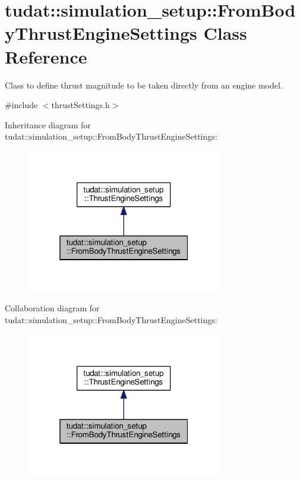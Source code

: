 \hypertarget{classtudat_1_1simulation__setup_1_1FromBodyThrustEngineSettings}{}\section{tudat\+:\+:simulation\+\_\+setup\+:\+:From\+Body\+Thrust\+Engine\+Settings Class Reference}
\label{classtudat_1_1simulation__setup_1_1FromBodyThrustEngineSettings}


Class to define thrust magnitude to be taken directly from an engine model.  




{\ttfamily \#include $<$thrust\+Settings.\+h$>$}



Inheritance diagram for tudat\+:\+:simulation\+\_\+setup\+:\+:From\+Body\+Thrust\+Engine\+Settings\+:
\nopagebreak
\begin{figure}[H]
\begin{center}
\leavevmode
\includegraphics[width=241pt]{classtudat_1_1simulation__setup_1_1FromBodyThrustEngineSettings__inherit__graph}
\end{center}
\end{figure}


Collaboration diagram for tudat\+:\+:simulation\+\_\+setup\+:\+:From\+Body\+Thrust\+Engine\+Settings\+:
\nopagebreak
\begin{figure}[H]
\begin{center}
\leavevmode
\includegraphics[width=241pt]{classtudat_1_1simulation__setup_1_1FromBodyThrustEngineSettings__coll__graph}
\end{center}
\end{figure}
